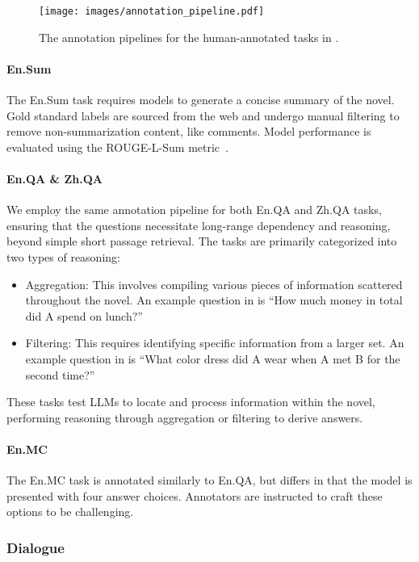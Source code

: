 \begin{figure}[t]
    \centering
    \texttt{[image: images/annotation\_pipeline.pdf]}
    \caption{The annotation pipelines for the human-annotated tasks in \OURS.}
    \label{fig:annotation-pipeline}
\end{figure}
\paragraph{En.Sum} 

The En.Sum task requires models to generate a concise summary of the novel. Gold standard labels are sourced from the web and undergo manual filtering to remove non-summarization content, like comments. Model performance is evaluated using the ROUGE-L-Sum metric~\citep{lin-2004-rouge}.

\paragraph{En.QA \& Zh.QA} 

We employ the same annotation pipeline for both En.QA and Zh.QA tasks, ensuring that the questions necessitate long-range dependency and reasoning, beyond simple short passage retrieval. The tasks are primarily categorized into two types of reasoning:
\begin{itemize}
    \item Aggregation: This involves compiling various pieces of information scattered throughout the novel. An example question in \OURSSPACE is ``How much money in total did A spend on lunch?''
    \item Filtering: This requires identifying specific information from a larger set. An example question in \OURSSPACE is ``What color dress did A wear when A met B for the second time?''
\end{itemize}

These tasks test LLMs to locate and process information within the novel, performing reasoning through aggregation or filtering to derive answers.

\paragraph{En.MC} 

The En.MC task is annotated similarly to En.QA, but differs in that the model is presented with four answer choices. Annotators are instructed to craft these options to be challenging.

\subsubsection{Dialogue}

